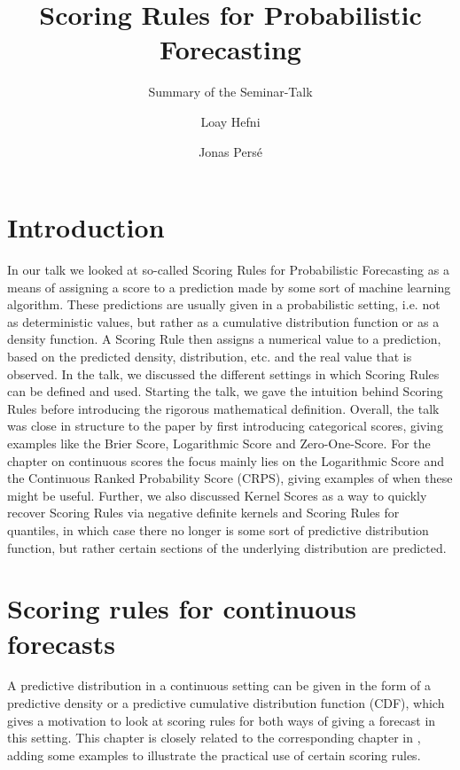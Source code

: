 \documentclass{def/tuberlin}
\author{Loay Hefni
	\and Jonas Persé 
}
\title{Scoring Rules for Probabilistic Forecasting}
\subtitle{Summary of the Seminar-Talk }
\theoremstyle{definition}
\theoremstyle{remark}
\begin{document}
    
\tuberlintitle

\tableofcontents

\newpage

\chapter{Introduction}
In our talk we looked at so-called Scoring Rules for Probabilistic Forecasting as a means of assigning a score to a prediction made by some sort of machine learning algorithm. These predictions are usually given in a probabilistic setting, i.e. not as deterministic values, but rather as a cumulative distribution function or as a density function. A Scoring Rule then assigns a numerical value to a prediction, based on the predicted density, distribution, etc. and the real value that is observed. In the talk, we discussed the different settings in which Scoring Rules can be defined and used. Starting the talk, we gave the intuition behind Scoring Rules before introducing the rigorous mathematical definition. Overall, the talk was close in structure to the paper \cite{Gneiting} by first introducing categorical scores, giving examples like the Brier Score, Logarithmic Score and Zero-One-Score. For the chapter on continuous scores the focus mainly lies on the Logarithmic Score and the Continuous Ranked Probability Score (CRPS), giving examples of when these might be useful. Further, we also discussed Kernel Scores as a way to quickly recover Scoring Rules via negative definite kernels and Scoring Rules for quantiles, in which case there no longer is some sort of predictive distribution function, but rather certain sections of the underlying distribution are predicted.

\newpage
\chapter{Scoring rules for continuous forecasts}
A predictive distribution in a continuous setting can be given in the form of a predictive density or a predictive cumulative distribution function (CDF), which gives a motivation to look at scoring rules for both ways of giving a forecast in this setting. This chapter is closely related to the corresponding chapter in \cite{Gneiting}, adding some examples to illustrate the practical use of certain scoring rules.
\end{document}
